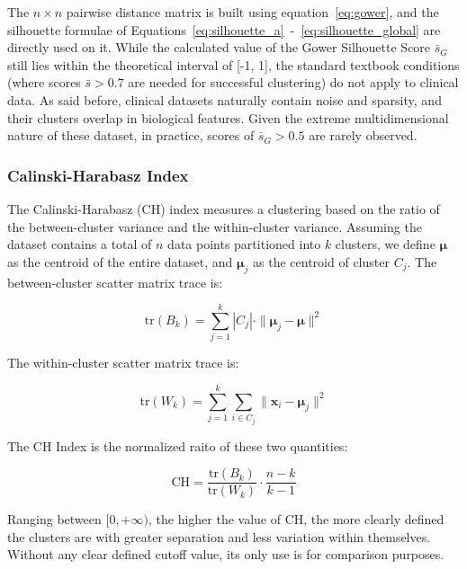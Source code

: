 The $n\times n$ pairwise distance matrix is built using equation~\eqref{eq:gower}, and the silhouette formulae of Equations~\eqref{eq:silhouette_a}~-~\eqref{eq:silhouette_global} are directly used on it. While the calculated value of the Gower Silhouette Score $\bar{s}_G$ still lies within the theoretical interval of [-1, 1], the standard textbook conditions (where scores $\bar{s} > 0.7$ are needed for successful clustering) do not apply to clinical data. As said before, clinical datasets naturally contain noise and sparsity, and their clusters overlap in biological features. Given the extreme multidimensional nature of these dataset, in practice, scores of $\bar{s}_G > 0.5$ are rarely observed.

\subsubsection*{Calinski-Harabasz Index}

The Calinski-Harabasz (CH) index \cite{calinski1974} measures a clustering based on the ratio of the between-cluster variance and the within-cluster variance. Assuming the dataset contains a total of $n$ data points partitioned into $k$ clusters, we define $\boldsymbol{\mu}$ as the centroid of the entire dataset, and $\boldsymbol{\mu}_j$ as the centroid of cluster $C_j$. The between-cluster scatter matrix trace is:

\begin{equation}
    \mathrm{tr}(B_k) = \sum_{j=1}^{k} |C_j| \cdot \|\boldsymbol{\mu}_j - \boldsymbol{\mu}\|^2
    \label{eq:ch_between}
\end{equation}

The within-cluster scatter matrix trace is:

\begin{equation}
    \mathrm{tr}(W_k) = \sum_{j=1}^{k} \sum_{i \in C_j} \|\mathbf{x}_i - \boldsymbol{\mu}_j\|^2
    \label{eq:ch_within}
\end{equation}

The CH Index is the normalized raito of these two quantities:

\begin{equation}
    \mathrm{CH} = \frac{\mathrm{tr}(B_k)}{\mathrm{tr}(W_k)} \cdot \frac{n - k}{k - 1}
    \label{eq:ch}
\end{equation}

Ranging between $[0, +\infty)$, the higher the value of CH, the more clearly defined the clusters are with greater separation and less variation within themselves. Without any clear defined cutoff value, its only use is for comparison purposes.

